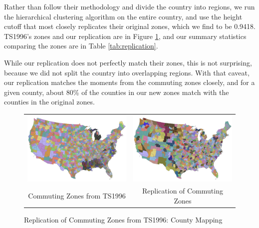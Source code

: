 Rather than follow their methodology and divide the country into regions, we run the hierarchical clustering algorithm on the entire country, and use the height cutoff that most closely replicates their original zones, which we find to be 0.9418. TS1996's zones and our replication are in Figure \ref{fig:czreplication}, and our summary statistics comparing the zones are in Table \ref{tab:replication}.

While our replication does not perfectly match their zones, this is not surprising, because we did not split the country into overlapping regions. With that caveat, our replication matches the moments from the commuting zones closely, and for a given county, about 80\% of the counties in our new zones match with the counties in the original zones.
\begin{figure}[tbh]\centering
\begin{tabular}{cc}
\includegraphics[scale=0.25]{./figures/commutingzones.png}&
\includegraphics[scale=0.25]{./figures/clustermap_jtw1990_x.png}\\
Commuting Zones from TS1996 & Replication of Commuting Zones \\
\end{tabular}
\caption{Replication of Commuting Zones from TS1996: County Mapping \label{fig:czreplication}}
\end{figure}


